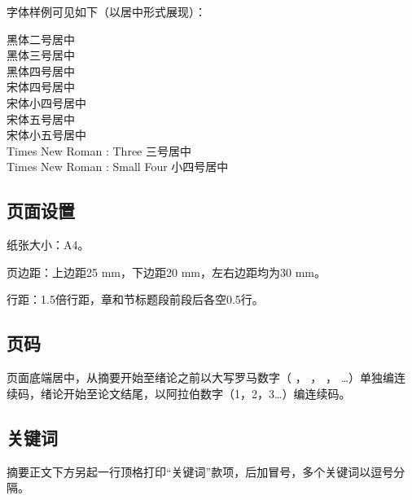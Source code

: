 字体样例可见如下（以居中形式展现）： \\



\begin{center}
{\heiti{}黑体二号居中} \\

{\heiti{}黑体三号居中} \\

{\heiti{}黑体四号居中} \\
 
{\songti{}宋体四号居中} \\

{\songti{}宋体小四号居中} \\

{\songti{}宋体五号居中} \\

{\songti{}宋体小五号居中} \\

{ Times New Roman : Three} 三号居中 \\ 

{ Times New Roman : Small Four} 小四号居中 \\

\end{center}


\subsection{页面设置}

纸张大小：A4。

页边距：上边距25 mm，下边距20 mm，左右边距均为30 mm。

行距：1.5倍行距，章和节标题段前段后各空0.5行。

\subsection{页码}

页面底端居中，从摘要开始至绪论之前以大写罗马数字（
\uppercase\expandafter{} ，
\uppercase\expandafter{} ，
\uppercase\expandafter{} ，
…）单独编连续码，绪论开始至论文结尾，以阿拉伯数字（1，2，3…）编连续码。

\subsection{关键词}


摘要正文下方另起一行顶格打印``关键词''款项，后加冒号，多个关键词以逗号分隔。

